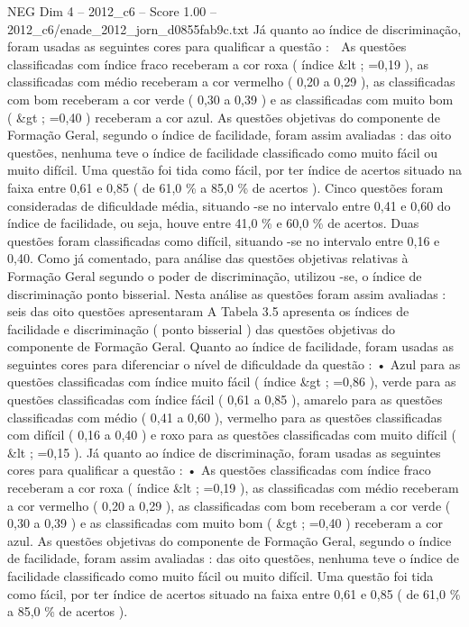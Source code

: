 \begin{textsample}{NEG Dim 4 – 2012\_c6 – Score 1.00 – 2012\_c6/enade\_2012\_jorn\_d0855fab9c.txt}
Já quanto ao índice de discriminação, foram usadas as seguintes cores para qualificar a questão :  As questões classificadas com índice fraco receberam a cor roxa ( índice \&lt ; =0,19 ), as classificadas com médio receberam a cor vermelho ( 0,20 a 0,29 ), as classificadas com bom receberam a cor verde ( 0,30 a 0,39 ) e as classificadas com muito bom ( \&gt ; =0,40 ) receberam a cor azul.
As questões objetivas do componente de Formação Geral, segundo o índice de facilidade, foram assim avaliadas : das oito questões, nenhuma teve o índice de facilidade classificado como muito fácil ou muito difícil.
Uma questão foi tida como fácil, por ter índice de acertos situado na faixa entre 0,61 e 0,85 ( de 61,0 \% a 85,0 \% de acertos ).
Cinco questões foram consideradas de dificuldade média, situando -se no intervalo entre 0,41 e 0,60 do índice de facilidade, ou seja, houve entre 41,0 \% e 60,0 \% de acertos.
Duas questões foram classificadas como difícil, situando -se no intervalo entre 0,16 e 0,40.
Como já comentado, para análise das questões objetivas relativas à Formação Geral segundo o poder de discriminação, utilizou -se, o índice de discriminação ponto bisserial.
Nesta análise as questões foram assim avaliadas : seis das oito questões apresentaram A Tabela 3.5 apresenta os índices de facilidade e discriminação ( ponto bisserial ) das questões objetivas do componente de Formação Geral.
Quanto ao índice de facilidade, foram usadas as seguintes cores para diferenciar o nível de dificuldade da questão : • Azul para as questões classificadas com índice muito fácil ( índice \&gt ; =0,86 ), verde para as questões classificadas com índice fácil ( 0,61 a 0,85 ), amarelo para as questões classificadas com médio ( 0,41 a 0,60 ), vermelho para as questões classificadas com difícil ( 0,16 a 0,40 ) e roxo para as questões classificadas com muito difícil ( \&lt ; =0,15 ).
Já quanto ao índice de discriminação, foram usadas as seguintes cores para qualificar a questão : • As questões classificadas com índice fraco receberam a cor roxa ( índice \&lt ; =0,19 ), as classificadas com médio receberam a cor vermelho ( 0,20 a 0,29 ), as classificadas com bom receberam a cor verde ( 0,30 a 0,39 ) e as classificadas com muito bom ( \&gt ; =0,40 ) receberam a cor azul.
As questões objetivas do componente de Formação Geral, segundo o índice de facilidade, foram assim avaliadas : das oito questões, nenhuma teve o índice de facilidade classificado como muito fácil ou muito difícil.
Uma questão foi tida como fácil, por ter índice de acertos situado na faixa entre 0,61 e 0,85 ( de 61,0 \% a 85,0 \% de acertos ).

\end{textsample}
